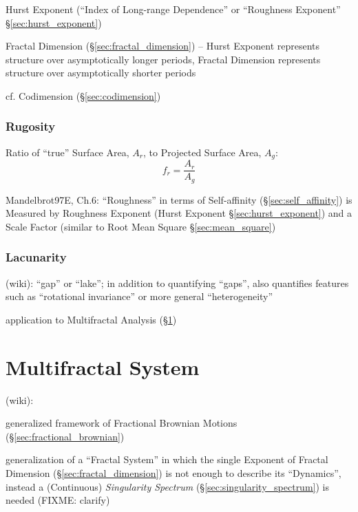 Hurst Exponent (``Index of Long-range Dependence'' or ``Roughness Exponent''
\S\ref{sec:hurst_exponent})

Fractal Dimension (\S\ref{sec:fractal_dimension}) -- Hurst Exponent represents
structure over asymptotically longer periods, Fractal Dimension represents
structure over asymptotically shorter periods

cf. Codimension (\S\ref{sec:codimension})



\subsubsection{Rugosity}\label{sec:rugosity}


Ratio of ``true'' Surface Area, $A_r$, to Projected Surface Area, $A_g$:
\[
  f_r = \frac{A_r}{A_g}
\]

Mandelbrot97E, Ch.6: ``Roughness'' in terms of Self-affinity
(\S\ref{sec:self_affinity}) is Measured by Roughness Exponent (Hurst Exponent
\S\ref{sec:hurst_exponent}) and a Scale Factor (similar to Root Mean Square
\S\ref{sec:mean_square})



\subsubsection{Lacunarity}\label{sec:lacunarity}


(wiki): ``gap'' or ``lake''; in addition to quantifying ``gaps'', also
quantifies features such as ``rotational invariance'' or more general
``heterogeneity''

application to Multifractal Analysis (\S\ref{sec:multifractal_system})



\section{Multifractal System}\label{sec:multifractal_system}

(wiki):

generalized framework of Fractional Brownian Motions
(\S\ref{sec:fractional_brownian})

generalization of a ``Fractal System'' in which the single Exponent of Fractal
Dimension (\S\ref{sec:fractal_dimension}) is not enough to describe its
``Dynamics'',  instead a (Continuous) \emph{Singularity Spectrum}
(\S\ref{sec:singularity_spectrum}) is needed (FIXME: clarify)

